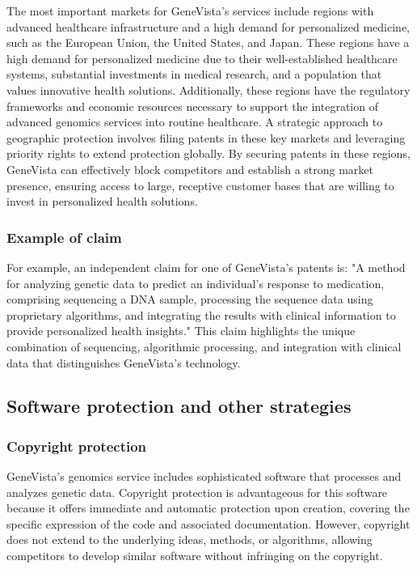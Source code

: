 \documentclass[a4paper]{article}
\begin{document}
The most important markets for GeneVista’s services include regions with advanced healthcare infrastructure and a high demand for personalized medicine, such as the European Union, the United States, and Japan. These regions have a high demand for personalized medicine due to their well-established healthcare systems, substantial investments in medical research, and a population that values innovative health solutions. Additionally, these regions have the regulatory frameworks and economic resources necessary to support the integration of advanced genomics services into routine healthcare. A strategic approach to geographic protection involves filing patents in these key markets and leveraging priority rights to extend protection globally. By securing patents in these regions, GeneVista can effectively block competitors and establish a strong market presence, ensuring access to large, receptive customer bases that are willing to invest in personalized health solutions.

\subsubsection{Example of claim}

For example, an independent claim for one of GeneVista's patents is: "A method for analyzing genetic data to predict an individual’s response to medication, comprising sequencing a DNA sample, processing the sequence data using proprietary algorithms, and integrating the results with clinical information to provide personalized health insights." This claim highlights the unique combination of sequencing, algorithmic processing, and integration with clinical data that distinguishes GeneVista’s technology.

\subsection{Software protection and other strategies}

\subsubsection{Copyright protection}

GeneVista’s genomics service includes sophisticated software that processes and analyzes genetic data. Copyright protection is advantageous for this software because it offers immediate and automatic protection upon creation, covering the specific expression of the code and associated documentation. However, copyright does not extend to the underlying ideas, methods, or algorithms, allowing competitors to develop similar software without infringing on the copyright.
\end{document}
